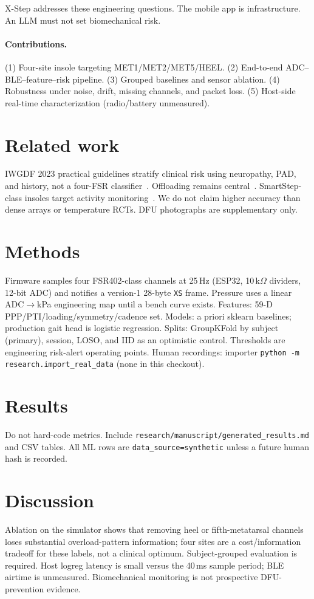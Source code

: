 \documentclass[runningheads]{llncs}
\begin{document}
X-Step addresses these engineering questions. The mobile app is infrastructure. An LLM must not set biomechanical risk.

\paragraph{Contributions.}
(1) Four-site insole targeting MET1/MET2/MET5/HEEL.
(2) End-to-end ADC--BLE--feature--risk pipeline.
(3) Grouped baselines and sensor ablation.
(4) Robustness under noise, drift, missing channels, and packet loss.
(5) Host-side real-time characterization (radio/battery unmeasured).

\section{Related work}
IWGDF 2023 practical guidelines stratify clinical risk using neuropathy, PAD, and history, not a four-FSR classifier~\cite{iwgdf2023}. Offloading remains central~\cite{bus2016,cavanagh2010}. SmartStep-class insoles target activity monitoring~\cite{hegde2014}. We do not claim higher accuracy than dense arrays or temperature RCTs. DFU photographs are supplementary only.

\section{Methods}
Firmware samples four FSR402-class channels at 25\,Hz (ESP32, 10\,k$\Omega$ dividers, 12-bit ADC) and notifies a version-1 28-byte \texttt{XS} frame. Pressure uses a linear ADC$\to$kPa engineering map until a bench curve exists. Features: 59-D PPP/PTI/loading/symmetry/cadence set. Models: a priori sklearn baselines; production gait head is logistic regression. Splits: GroupKFold by subject (primary), session, LOSO, and IID as an optimistic control. Thresholds are engineering risk-alert operating points. Human recordings: importer \texttt{python -m research.import\_real\_data} (none in this checkout).

\section{Results}
Do not hard-code metrics. Include \texttt{research/manuscript/generated\_results.md} and CSV tables. All ML rows are \texttt{data\_source=synthetic} unless a future human hash is recorded.

\section{Discussion}
Ablation on the simulator shows that removing heel or fifth-metatarsal channels loses substantial overload-pattern information; four sites are a cost/information tradeoff for these labels, not a clinical optimum. Subject-grouped evaluation is required. Host logreg latency is small versus the 40\,ms sample period; BLE airtime is unmeasured. Biomechanical monitoring is not prospective DFU-prevention evidence.
\end{document}
